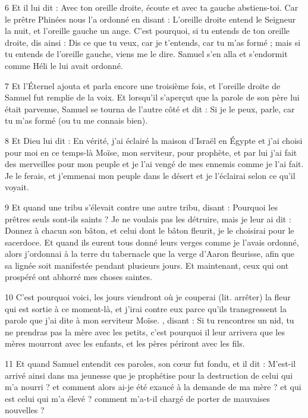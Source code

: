 \par 6 Et il lui dit : Avec ton oreille droite, écoute et avec ta gauche abstiens-toi. Car le prêtre Phinées nous l'a ordonné en disant : L'oreille droite entend le Seigneur la nuit, et l'oreille gauche un ange. C'est pourquoi, si tu entends de ton oreille droite, dis ainsi : Dis ce que tu veux, car je t'entends, car tu m'as formé ; mais si tu entends de l'oreille gauche, viens me le dire. Samuel s'en alla et s'endormit comme Héli le lui avait ordonné.

\par 7 Et l'Éternel ajouta et parla encore une troisième fois, et l'oreille droite de Samuel fut remplie de la voix. Et lorsqu'il s'aperçut que la parole de son père lui était parvenue, Samuel se tourna de l'autre côté et dit : Si je le peux, parle, car tu m'as formé (ou tu me connais bien).

\par 8 Et Dieu lui dit : En vérité, j'ai éclairé la maison d'Israël en Égypte et j'ai choisi pour moi en ce temps-là Moïse, mon serviteur, pour prophète, et par lui j'ai fait des merveilles pour mon peuple et je l'ai vengé de mes ennemis comme je l'ai fait. Je le ferais, et j'emmenai mon peuple dans le désert et je l'éclairai selon ce qu'il voyait.

\par 9 Et quand une tribu s'élevait contre une autre tribu, disant : Pourquoi les prêtres seuls sont-ils saints ? Je ne voulais pas les détruire, mais je leur ai dit : Donnez à chacun son bâton, et celui dont le bâton fleurit, je le choisirai pour le sacerdoce. Et quand ils eurent tous donné leurs verges comme je l'avais ordonné, alors j'ordonnai à la terre du tabernacle que la verge d'Aaron fleurisse, afin que sa lignée soit manifestée pendant plusieurs jours. Et maintenant, ceux qui ont prospéré ont abhorré mes choses saintes.

\par 10 C'est pourquoi voici, les jours viendront où je couperai (lit. arrêter) la fleur qui est sortie à ce moment-là, et j'irai contre eux parce qu'ils transgressent la parole que j'ai dite à mon serviteur Moïse. , disant : Si tu rencontres un nid, tu ne prendras pas la mère avec les petits, c'est pourquoi il leur arrivera que les mères mourront avec les enfants, et les pères périront avec les fils.

\par 11 Et quand Samuel entendit ces paroles, son cœur fut fondu, et il dit : M'est-il arrivé ainsi dans ma jeunesse que je prophétise pour la destruction de celui qui m'a nourri ? et comment alors ai-je été exaucé à la demande de ma mère ? et qui est celui qui m'a élevé ? comment m'a-t-il chargé de porter de mauvaises nouvelles ?

